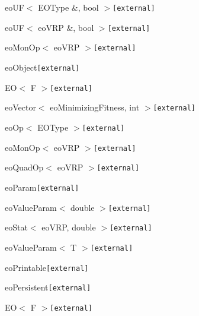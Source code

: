 \begin{CompactList}
\begin{CompactList}
\begin{CompactList}
\begin{CompactList}
\begin{CompactList}
\item {}
\end{CompactList}
\end{CompactList}
\end{CompactList}
\item eo\-UF$<$ EOType \&, bool $>${\tt  [external]}\item eo\-UF$<$ eo\-VRP \&, bool $>${\tt  [external]}\begin{CompactList}
\item eo\-Mon\-Op$<$ eo\-VRP $>${\tt  [external]}\begin{CompactList}
\item {}
\end{CompactList}
\end{CompactList}
\end{CompactList}
\item eo\-Object{\tt  [external]}\begin{CompactList}
\item EO$<$ F $>${\tt  [external]}\begin{CompactList}
\item eo\-Vector$<$ eo\-Minimizing\-Fitness, int $>${\tt  [external]}\begin{CompactList}
\item {}
\end{CompactList}
\end{CompactList}
\end{CompactList}
\item eo\-Op$<$ EOType $>${\tt  [external]}\begin{CompactList}
\item eo\-Mon\-Op$<$ eo\-VRP $>${\tt  [external]}\item eo\-Quad\-Op$<$ eo\-VRP $>${\tt  [external]}\end{CompactList}
\item eo\-Param{\tt  [external]}\begin{CompactList}
\item eo\-Value\-Param$<$ double $>${\tt  [external]}\begin{CompactList}
\item eo\-Stat$<$ eo\-VRP, double $>${\tt  [external]}\end{CompactList}
\item eo\-Value\-Param$<$ T $>${\tt  [external]}\end{CompactList}
\item eo\-Printable{\tt  [external]}\begin{CompactList}
\item eo\-Persistent{\tt  [external]}\begin{CompactList}
\item EO$<$ F $>${\tt  [external]}\end{CompactList}
\end{CompactList}
\end{CompactList}
